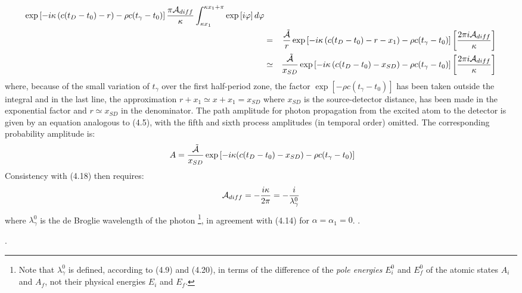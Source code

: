 {\begin{eqnarray}
   \exp\left[ -i \kappa\left( c(t_D-t_0)- r \right)-\rho c (t_{\gamma}-t_0) \right]\frac{\pi {\cal A}_{diff}}
    {\kappa}
   \int_{\kappa x_1}^{\kappa x_1 +\pi} \exp\left[ i\varphi \right]d\varphi
  \nonumber \\
  & = & \frac{\tilde{{\cal A}}}{r}
    \exp\left[ -i \kappa \left( c(t_D-t_0)- r-x_1\right)-\rho c (t_{\gamma}-t_0) \right]
    \left[\frac{ 2 \pi i {\cal A}_{diff}}{\kappa}\right] \nonumber \\
 & \simeq & \frac{\tilde{{\cal A}}}{x_{SD}}
    \exp\left[ -i \kappa \left( c(t_D-t_0)- x_{SD} \right)-\rho c (t_{\gamma}-t_0) \right]
    \left[\frac{ 2 \pi i {\cal A}_{diff}}{\kappa}\right]
 \end{eqnarray}
    where, because of the small variation of $t_{\gamma}$ over the first half-period zone, the factor
     $\exp\left[-\rho c (t_{\gamma}-t_0)\right]$ has been taken outside the integral
  and in the last line, the approximation $r +x_1 \simeq  x +x_1 = x_{SD}$ where $x_{SD}$ is the
   source-detector distance, has been made in the exponential factor
   and $r  \simeq  x_{SD}$ in the denominator.
    The path amplitude for photon propagation from the excited atom to the detector is
    given by an equation analogous
   to (4.5), with the fifth and sixth  process amplitudes (in temporal order) omitted.
   The corresponding probability amplitude is:
    \begin{equation}
  \ A = \frac{\tilde{{\cal A}}}{x_{SD}}
   \exp\left[ -i \kappa ( c(t_D-t_0)- x_{SD})-\rho c (t_{\gamma}-t_0) \right] 
 \end{equation}
  Consistency with (4.18) then requires:
    \begin{equation}
   {\cal A}_{diff} = -\frac{i \kappa}{2 \pi} = -\frac{i}{\lambda_{\gamma}^0}
  \end{equation}
  where $\lambda_{\gamma}^0$ is the de Broglie wavelength of the photon
   \footnote{Note that $\lambda_{\gamma}^0$ is defined, according to (4.9) and (4.20), in terms of the
    difference of the  {\it pole energies} $E_i^0$ and $E_f^0$ of the atomic states $A_i$ and $A_f$,
    not their physical energies  $E_i$ and $E_f$.}, in agreement with (4.14)
   for $\alpha = \alpha_1 = 0$.
  .
 
.
 
}
